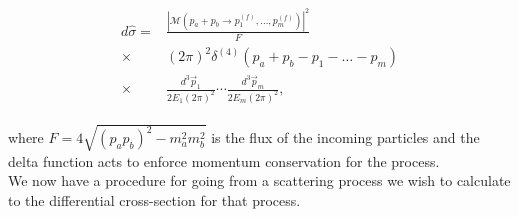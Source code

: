 	\begin{align}
	\begin{split}
		d\hat{\sigma} = &\frac{|\mathcal{M}(p_{a} + p_{b}\rightarrow p_{1}^{(f)}, \ldots, p_{m}^{(f)})|^2}{F}\\
		\times&(2\pi)^2\delta^{(4)}(p_{a} + p_{b} - p_{1} - \ldots - p_{m}) \\
		\times&\frac{d^3\vec{p}_1}{2E_1(2\pi)^2}\cdots\frac{d^3\vec{p}_m}{2E_m(2\pi)^2},
	\end{split}
	\end{align}

	where $F=4\sqrt{(p_ap_b)^2 - m_a^2m_b^2}$ is the flux of the incoming particles and the delta function acts to
	enforce momentum conservation for the process.\\We now have a procedure for going from a scattering process
	we wish to calculate to the differential cross-section for that process.

